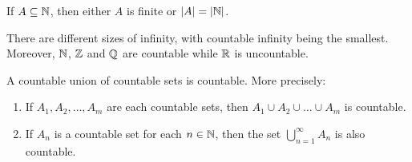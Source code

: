 \documentclass[11pt,twoside=off,numbers=noenddot]{scrbook}
\begin{document}
\begin{corollary}
    If $A \subseteq \mathbb N$, then either $A$ is finite or $| A | = | \mathbb N |$.
\end{corollary}

\begin{corollary}
    There are different sizes of infinity, with countable infinity being the smallest. Moreover, $\mathbb N$, $\mathbb Z$ and $\mathbb Q$ are countable while $\mathbb R$ is uncountable.
\end{corollary}

\begin{theorem}
    A countable union of countable sets is countable. More precisely:
    \begin{enumerate}
        \item If $A_1, A_2, \dots, A_m$ are each countable sets, then $A_1 \cup A_2 \cup \dots \cup A_m$ is countable.
        \item If $A_n$ is a countable set for each $n \in \mathbb N$, then the set $\bigcup_{n = 1}^{\infty} A_n$ is also countable.
    \end{enumerate}
\end{theorem}
\end{document}
